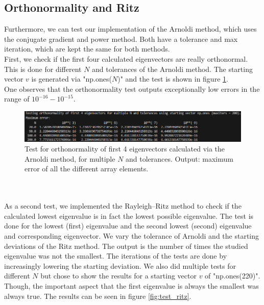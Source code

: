 \documentclass[11pt, letterpaper, onecolumn]{article}
\begin{document}
	
	\subsection{Orthonormality and Ritz}
	Furthermore, we can test our implementation of the Arnoldi method, which uses the conjugate gradient and power method. Both have a tolerance and max iteration, which are kept the same for both methods.\\
	First, we check if the first four calculated eigenvectors are really orthonormal. This is done for different $N$ and tolerances of the Arnoldi method. The starting vector $v$ is generated via "np.ones($N$)" and the test is shown in figure \ref{fig:test_orth}.\\
	One observes that the orthonormality test outputs exceptionally low errors in the range of $10^{-16}-10^{-15}$.
	\begin{figure} [h] 
	\begin{center}	
	\includegraphics[width=19cm]{"test_eigen_orth-tol.png"}
	\caption{Test for orthonormality of first 4 eigenvectors calculated via the Arnoldi method, for multiple $N$ and tolerances. Output: maximum error of all the different array elements.} \label{fig:test_orth}
	\end{center}
	\end{figure}
	\\
	\\
	As a second test, we implemented the Rayleigh–Ritz method to check if the calculated lowest eigenvalue is in fact the lowest possible eigenvalue. The test is done for the lowest (first) eigenvalue and the second lowest (second) eigenvalue and corresponding eigenvector. We vary the tolerance of Arnoldi and the starting deviations of the Ritz method. The output is the number of times the studied eigenvalue was not the smallest. The iterations of the tests are done by increasingly lowering the starting deviation. We also did multiple tests for different $N$ but chose to show the results for a starting vector $v$ of "np.ones(220)". Though, the important aspect that the first eigenvalue is always the smallest was always true. The results can be seen in figure \ref{fig:test_ritz}.
\end{document}
